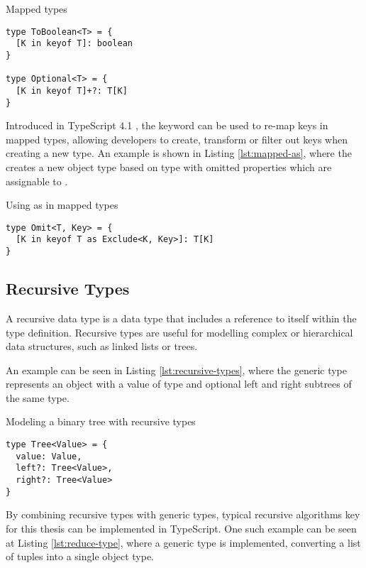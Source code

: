 \begin{listing}[ht]
  \caption{Mapped types}\label{lst:mapped-types}
  \begin{verbatim}
type ToBoolean<T> = {
  [K in keyof T]: boolean
}

type Optional<T> = {
  [K in keyof T]+?: T[K]
}
\end{verbatim}
\end{listing}

Introduced in TypeScript 4.1 \cite{AnnouncingTypeScript4.1}, the  keyword can be used to re-map keys in mapped types, allowing developers to create, transform or filter out keys when creating a new type. An example is shown in Listing \ref{lst:mapped-as}, where the  creates a new object type based on type  with omitted properties which are assignable to .

\begin{listing}[ht]
  \caption{Using as in mapped types}\label{lst:mapped-as}
  \begin{verbatim}
type Omit<T, Key> = {
  [K in keyof T as Exclude<K, Key>]: T[K]
}
\end{verbatim}
\end{listing}

\subsection{Recursive Types}

A recursive data type is a data type that includes a reference to itself within the type definition. Recursive types are useful for modelling complex or hierarchical data structures, such as linked lists or trees.

An example can be seen in Listing \ref{lst:recursive-types}, where the  generic type represents an object with a value of type  and optional left and right subtrees of the same type.

\begin{listing}[ht]
  \caption{Modeling a binary tree with recursive types}\label{lst:recursive-types}
  \begin{verbatim}
type Tree<Value> = {
  value: Value,
  left?: Tree<Value>,
  right?: Tree<Value>
}
\end{verbatim}
\end{listing}

By combining recursive types with generic types, typical recursive algorithms key for this thesis can be implemented in TypeScript. One such example can be seen at Listing \ref{lst:reduce-type}, where a  generic type is implemented, converting a list of  tuples into a single object type.

